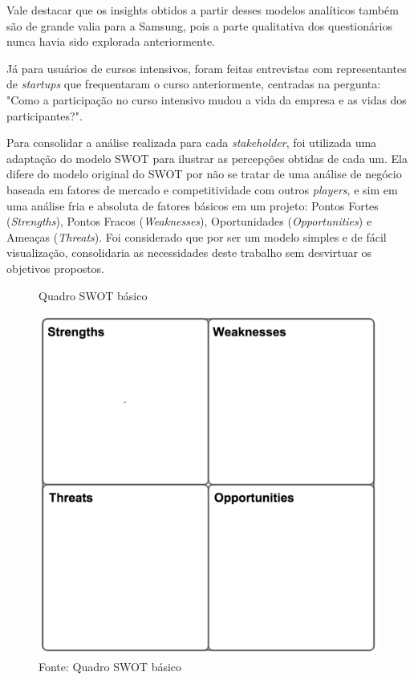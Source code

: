 Vale destacar que os insights obtidos a partir desses modelos analíticos também são de grande valia para a Samsung, pois a parte qualitativa dos questionários nunca havia sido explorada anteriormente. 

Já para usuários de cursos intensivos, foram feitas entrevistas com representantes de \textit{startups} que frequentaram o curso anteriormente, centradas na pergunta: "Como a participação no curso intensivo mudou a vida da empresa e as vidas dos participantes?".

Para consolidar a análise realizada para cada \textit{stakeholder}, foi utilizada uma adaptação do modelo SWOT para ilustrar as percepções obtidas de cada um. Ela difere do modelo original do SWOT por não se tratar de uma análise de negócio baseada em fatores de mercado e competitividade com outros \textit{players}, e sim em uma análise fria e absoluta de fatores básicos em um projeto: Pontos Fortes (\textit{Strengths}), Pontos Fracos (\textit{Weaknesses}), Oportunidades (\textit{Opportunities}) e Ameaças (\textit{Threats}). Foi considerado que por ser um modelo simples e de fácil visualização, consolidaria as necessidades deste trabalho sem desvirtuar os objetivos propostos.

\begin{figure}[h]
\caption{Quadro SWOT básico}
\centerline{\includegraphics[scale=0.5]{img/detailedswot}}
\label{fig:detailedswot}
\caption* {Fonte: Quadro SWOT básico}
\end{figure}

